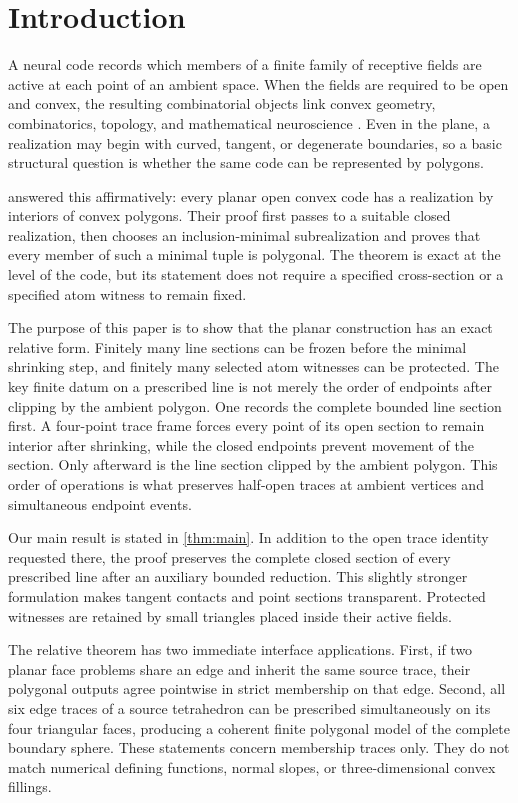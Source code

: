 \section{Introduction}

A neural code records which members of a finite family of receptive fields
are active at each point of an ambient space.  When the fields are required
to be open and convex, the resulting combinatorial objects link convex
geometry, combinatorics, topology, and mathematical neuroscience
\citep{CurtoItskovVelizYoungs2013,CurtoEtAl2017,CruzEtAl2019}.  Even in the
plane, a realization may begin with curved, tangent, or degenerate
boundaries, so a basic structural question is whether the same code can be
represented by polygons.

\citet{BukhJeffs2023} answered this affirmatively: every planar open convex
code has a realization by interiors of convex polygons.  Their proof first
passes to a suitable closed realization, then chooses an inclusion-minimal
subrealization and proves that every member of such a minimal tuple is
polygonal.  The theorem is exact at the level of the code, but its statement
does not require a specified cross-section or a specified atom witness to
remain fixed.

The purpose of this paper is to show that the planar construction has an
exact relative form.  Finitely many line sections can be frozen before the
minimal shrinking step, and finitely many selected atom witnesses can be
protected.  The key finite datum on a prescribed line is not merely the
order of endpoints after clipping by the ambient polygon.  One records the
complete bounded line section first.  A four-point trace frame forces every
point of its open section to remain interior after shrinking, while the
closed endpoints prevent movement of the section.  Only afterward is the
line section clipped by the ambient polygon.  This order of operations is
what preserves half-open traces at ambient vertices and simultaneous endpoint
events.

Our main result is stated in \cref{thm:main}.  In addition to the open trace
identity requested there, the proof preserves the complete closed section
of every prescribed line after an auxiliary bounded reduction.  This
slightly stronger formulation makes tangent contacts and point sections
transparent.  Protected witnesses are retained by small triangles placed
inside their active fields.

The relative theorem has two immediate interface applications.  First, if
two planar face problems share an edge and inherit the same source trace,
their polygonal outputs agree pointwise in strict membership on that edge.
Second, all six edge traces of a source tetrahedron can be prescribed
simultaneously on its four triangular faces, producing a coherent finite
polygonal model of the complete boundary sphere.  These statements concern
membership traces only.  They do not match numerical defining functions,
normal slopes, or three-dimensional convex fillings.

